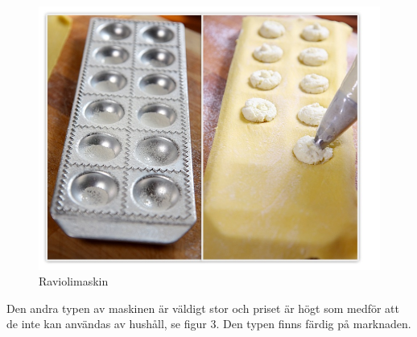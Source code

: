 	 		 		\begin{figure}[h]
	 		 			\begin{center}
	 		 				\includegraphics[scale=0.5]{images/raviolimoldwithfilling.jpg}
	 		 				\caption{Raviolimaskin}
	 		 				\label{ravioli}	
	 		 			\end{center}
	 		 		\end{figure}
Den andra typen av maskinen är väldigt stor och priset är högt som medför att de inte kan användas av hushåll, se figur 3. Den typen finns färdig på marknaden.
